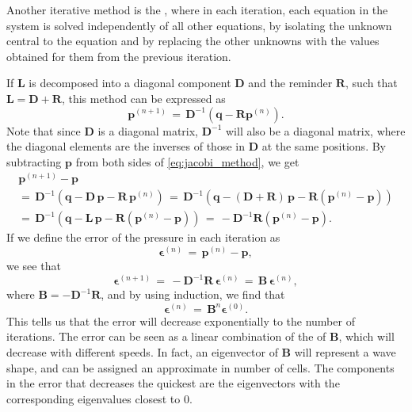 Another iterative method is the , where in each iteration, each equation in the system is solved independently of all other equations, by isolating the unknown central to the equation and by replacing the other unknowns with the values obtained for them from the previous iteration.

If $\mathbf{L}$ is decomposed into a diagonal component $\mathbf{D}$ and the reminder $\mathbf{R}$, such that $\mathbf{L} = \mathbf{D} + \mathbf{R}$, this method can be expressed as
%
\begin{equation} \label{eq:jacobi_method}
\mathbf{p}^{(n+1)} \,=\, \mathbf{D}^{-1}(\mathbf{q} - \mathbf{R}\mathbf{p}^{(n)}).
\end{equation}
%
Note that since $\mathbf{D}$ is a diagonal matrix, $\mathbf{D}^{-1}$ will also be a diagonal matrix, where the diagonal elements are the inverses of those in $\mathbf{D}$ at the same positions. By subtracting $\mathbf{p}$ from both sides of \eqref{eq:jacobi_method}, we get
%
\begin{equation}
\renewcommand*{\arraystretch}{1.5}
\begin{array}{c}
\mathbf{p}^{(n+1)} - \mathbf{p} \\
=\, \mathbf{D}^{-1}(\mathbf{q} - \mathbf{D}\,\mathbf{p} - \mathbf{R}\,\mathbf{p}^{(n)}) \,=\, \mathbf{D}^{-1}(\mathbf{q} - (\mathbf{D} + \mathbf{R})\,\mathbf{p} - \mathbf{R}(\mathbf{p}^{(n)} - \mathbf{p})) \\
=\, \mathbf{D}^{-1}(\mathbf{q} - \mathbf{L}\,\mathbf{p} - \mathbf{R}(\mathbf{p}^{(n)} - \mathbf{p})) \,=\, -\mathbf{D}^{-1}\mathbf{R}(\mathbf{p}^{(n)} - \mathbf{p}).
\end{array}
\end{equation}
%
If we define the error of the pressure in each iteration as
%
\begin{equation} \label{eq:pressure_error}
\mathbf{\epsilon}^{(n)} \,=\, \mathbf{p}^{(n)} - \mathbf{p},
\end{equation}
%
we see that
%
\begin{equation} \label{eq:jacobi_method_error}
\mathbf{\epsilon}^{(n+1)} \,=\, -\mathbf{D}^{-1}\mathbf{R}\,\mathbf{\epsilon}^{(n)} \,=\, \mathbf{B}\,\mathbf{\epsilon}^{(n)},
\end{equation}
%
where $\mathbf{B} = -\mathbf{D}^{-1}\mathbf{R}$, and by using induction, we find that
%
\begin{equation} \label{eq:jacobi_method_error_from_initial_error}
\mathbf{\epsilon}^{(n)} \,=\, \mathbf{B}^n\mathbf{\epsilon}^{(0)}.
\end{equation}
%
This tells us that the error will decrease exponentially to the number of iterations. The error can be seen as a linear combination of the \eigenvectors of $\mathbf{B}$, which will decrease with different speeds. In fact, an eigenvector of $\mathbf{B}$ will represent a wave shape, and can be assigned an approximate \wavelength in number of cells. The components in the error that decreases the quickest are the eigenvectors with the corresponding eigenvalues closest to 0.

